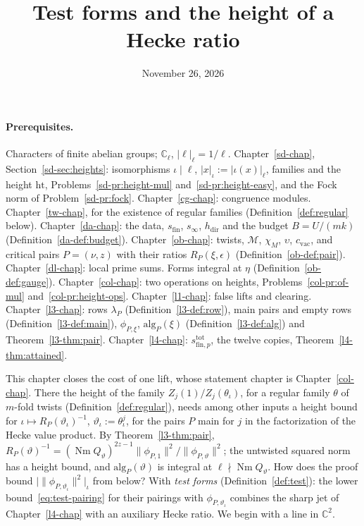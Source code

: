 \documentclass[reqno]{amsart}
\title{Test forms and the height of a Hecke ratio}
\author{}
\date{November 26, 2026}
\newcounter{chap}
\theoremstyle{definition}
\theoremstyle{plain}
\theoremstyle{remark}
\newcommand{\C}{\mathbb{C}}
\newcommand{\Nm}{\operatorname{Nm}}
\newcommand{\alg}{\mathrm{alg}}
\newcommand{\hdir}{h_{\mathrm{dir}}}
\newcommand{\sfin}{s_{\mathrm{fin}}}
\newcommand{\stot}[1]{s^{\mathrm{tot}}_{\mathrm{fin},#1}}
\newcommand{\cvac}{c_{\mathrm{vac}}}
\begin{document}
\maketitle
{}\label{chap}

\paragraph{Prerequisites.}
Characters of finite abelian groups; \(\C_\ell\), \(\lvert\ell\rvert_\ell = 1/\ell\).  Chapter~\ref{sd-chap}, Section~\ref{sd-sec:heights}: isomorphisms \(\iota \mid \ell\), \(\lvert x\rvert_\iota := \lvert\iota(x)\rvert_\ell\), families and the height \(\mathrm{ht}\), Problems~\ref{sd-pr:height-mul} and~\ref{sd-pr:height-easy}, and the Fock norm of Problem~\ref{sd-pr:fock}.  Chapter~\ref{cg-chap}: congruence modules.  Chapter~\ref{tw-chap}, for the existence of regular families (Definition~\ref{def:regular} below).  Chapter~\ref{da-chap}: the data, \(\sfin\), \(s_\infty\), \(\hdir\) and the budget \(B = U/(mk)\) (Definition~\ref{da-def:budget}).  Chapter~\ref{ob-chap}: twists, \(\mathcal M\), \(\chi_M\), \(\upsilon\), \(\cvac\), and critical pairs \(P = (\nu, z)\) with their ratios \(R_P(\xi, \epsilon)\) (Definition~\ref{ob-def:pair}).  Chapter~\ref{dl-chap}: local prime sums.  Forms integral at \(\eta\) (Definition~\ref{ob-def:gauge}).  Chapter~\ref{col-chap}: two operations on heights, Problems~\ref{col-pr:of-mul} and~\ref{col-pr:height-ops}.  Chapter~\ref{l1-chap}: false lifts and clearing.  Chapter~\ref{l3-chap}: rows \(\lambda_P\) (Definition~\ref{l3-def:row}), main pairs and empty rows (Definition~\ref{l3-def:main}), \(\phi_{P,\xi}\), \(\alg_P(\xi)\) (Definition~\ref{l3-def:alg}) and Theorem~\ref{l3-thm:pair}.  Chapter~\ref{l4-chap}: \(\stot p\), the twelve copies, Theorem~\ref{l4-thm:attained}.

\medskip
This chapter closes the cost of one lift, whose statement chapter is Chapter~\ref{col-chap}.  There the height of the family \(Z_j(1)/Z_j(\theta_\iota)\), for a regular family \(\theta\) of \(m\)-fold twists (Definition~\ref{def:regular}), needs among other inputs a height bound for \(\iota \mapsto R_P(\vartheta_\iota)^{-1}\), \(\vartheta_\iota := \theta_\iota^j\), for the pairs \(P\) main for \(j\) in the factorization of the Hecke value product.  By Theorem~\ref{l3-thm:pair}, \(R_P(\vartheta)^{-1} = (\Nm Q_\vartheta)^{2z-1}\lVert\phi_{P,1}\rVert^2/\lVert\phi_{P,\vartheta}\rVert^2\); the untwisted squared norm has a height bound, and \(\alg_P(\vartheta)\) is integral at \(\ell \nmid \Nm Q_\vartheta\).  How does the proof bound \(\lvert\lVert\phi_{P,\vartheta_\iota}\rVert^2\rvert_\iota\) from below?  With \emph{test forms} (Definition~\ref{def:test}): the lower bound~\eqref{eq:test-pairing} for their pairings with \(\phi_{P,\vartheta_\iota}\) combines the sharp jet of Chapter~\ref{l4-chap} with an auxiliary Hecke ratio.  We begin with a line in \(\C^2\).
\end{document}
